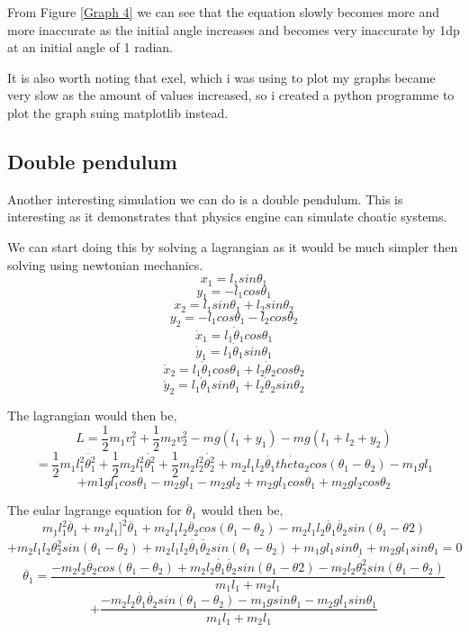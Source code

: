 \documentclass[12pt, a2paper]{article}
\begin{document}
From Figure \ref{Graph 4} we can see that the equation slowly becomes more and more inaccurate as the initial angle increases and becomes very inaccurate by 1dp at an initial angle of 1 radian.

It is also worth noting that exel, which i was using to plot my graphs became very slow as the amount of values increased, so i created a python programme to plot the graph suing matplotlib instead.
\pagebreak

\subsection{Double pendulum}
Another interesting simulation we can do is a double pendulum. This is interesting as it demonstrates that physics engine can simulate choatic systems.

We can start doing this by solving a lagrangian as it would be much simpler then solving using newtonian mechanics.
\[x_{1} = l_{1}sin\theta_{1}\]
\[y_{1} = -l_{1}cos\theta_{1}\]
\[x_{2} = l_{1}sin\theta_{1}+l_{2}sin\theta_{2}\]
\[y_{2} = -l_{1}cos\theta_{1}-l_{2}cos\theta_{2}\]
\[\dot{x}_{1} = l_{1}\dot{\theta}_{1}cos\theta_{1}\]
\[\dot{y}_{1} = l_{1}\dot{\theta}_{1}sin\theta_{1}\]
\[\dot{x}_{2} = l_{1}\dot{\theta}_{1}cos\theta_{1}+l_{2}\dot{\theta}_{2}cos\theta_{2}\]
\[\dot{y}_{2} = l_{1}\dot{\theta}_{1}sin\theta_{1}+l_{2}\dot{\theta}_{2}sin\theta_{2}\]

The lagrangian would then be,
\[L = \frac{1}{2}m_{1}v_{1}^2+\frac{1}{2}m_{2}v_{2}^2-mg(l_{1}+y_{1})-mg(l_{1}+l_{2}+y_{2})\]
\[= \frac{1}{2}m_{1}l_{1}^2\dot{\theta_{1}^2}+\frac{1}{2}m_{2}l_{1}^2\dot{\theta_{1}^2}+\frac{1}{2}m_{2}l_{2}^2\dot{\theta_{2}^2}+m_{2}l_{1}l_{2}\dot{\theta_{1}}\dot{theta_{2}}cos(\theta_{1}-\theta_{2})-m_{1}gl_{1}\]
\[+m{1}gl_{1}cos\theta_{1}-m_{2}gl_{1}-m_{2}gl_{2}+m_{2}gl_{1}cos\theta_{1}+m_{2}gl_{2}cos\theta_{2}\]

The eular lagrange equation for \(\ddot{\theta_{1}}\) would then be,
\[m_{1}l_{1}^2\ddot{\theta_{1}}+m_{2}l_{1}]^2\ddot{\theta_{1}}+m_{2}l_{1}l_{2}\ddot{\theta_{2}}cos(\theta_{1}-\theta_{2})-m_{2}l_{1}l_{2}\dot{\theta_{1}}\dot{\theta_{2}}sin(\theta_{1}-\theta{2})\]
\[+m_{2}l_{1}l_{2}\dot{\theta_{2}^2}sin(\theta_{1}-\theta_{2})+m_{2}l_{1}l_{2}\dot{\theta_{1}}\dot{\theta_{2}}sin(\theta_{1}-\theta_{2})+m_{1}gl_{1}sin\theta_{1}+m_{2}gl_{1}sin\theta_{1} = 0\]
\[\ddot{\theta_{1}} = \frac{-m_{2}l_{2}\ddot{\theta_{2}}cos(\theta_{1}-\theta_{2})+m_{2}l_{2}\dot{\theta_{1}}\dot{\theta_{2}}sin(\theta_{1}-\theta{2})-m_{2}l_{2}\dot{\theta_{2}^2}sin(\theta_{1}-\theta_{2})}{m_{1}l_{1}+m_{2}l_{1}}\]
\[+\frac{-m_{2}l_{2}\dot{\theta_{1}}\dot{\theta_{2}}sin(\theta_{1}-\theta_{2})-m_{1}gsin\theta_{1}-m_{2}gl_{1}sin\theta_{1}}{m_{1}l_{1}+m_{2}l_{1}}\]
\end{document}
